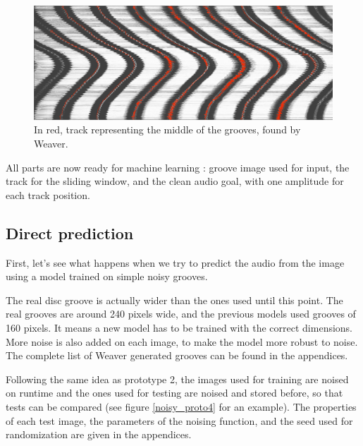 \documentclass[12pt, twoside]{article}
\begin{document}
\begin{figure}
	\centering
	\includegraphics[width=1\textwidth]{../images/track_johnny.png}
	\caption{In red, track representing the middle of the grooves, found by Weaver.}
	\label{track_johnny}
\end{figure}

All parts are now ready for machine learning : groove image used for input, the track for the sliding window, and the clean audio goal, with one amplitude for each track position.

\subsection{Direct prediction}
First, let's see what happens when we try to predict the audio from the image using a model trained on simple noisy grooves.

The real disc groove is actually wider than the ones used until this point. The real grooves are around 240 pixels wide, and the previous models used grooves of 160 pixels. It means a new model has to be trained with the correct dimensions. More noise is also added on each image, to make the model more robust to noise. The complete list of Weaver generated grooves can be found in the appendices.

Following the same idea as prototype 2, the images used for training are noised on runtime and the ones used for testing are noised and stored before, so that tests can be compared (see figure \ref{noisy_proto4} for an example). The properties of each test image, the parameters of the noising function, and the seed used for randomization are given in the appendices.
\end{document}
